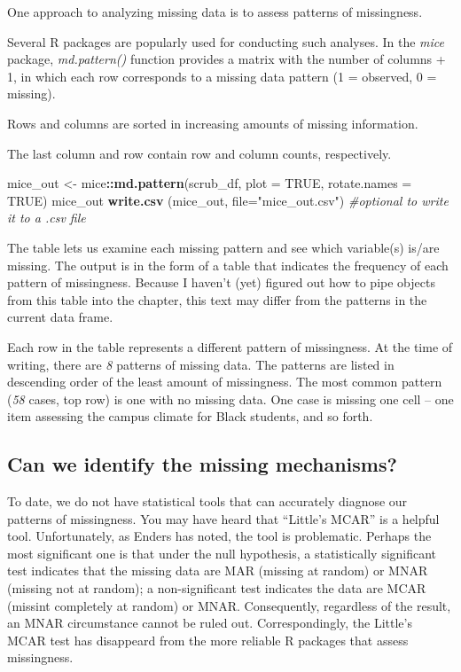 \documentclass[
  11pt,
]{book}
\newenvironment{Shaded}{\begin{snugshade}}{\end{snugshade}}
\newcommand{\AttributeTok}[1]{\textcolor[rgb]{0.27,0.27,0.27}{#1}}
\newcommand{\CommentTok}[1]{\textcolor[rgb]{0.37,0.37,0.37}{\textit{#1}}}
\newcommand{\ConstantTok}[1]{\textcolor[rgb]{0.37,0.37,0.37}{#1}}
\newcommand{\FunctionTok}[1]{\textcolor[rgb]{0.27,0.27,0.27}{\textbf{#1}}}
\newcommand{\NormalTok}[1]{#1}
\newcommand{\OtherTok}[1]{\textcolor[rgb]{0.37,0.37,0.37}{#1}}
\newcommand{\SpecialCharTok}[1]{\textcolor[rgb]{0.43,0.43,0.43}{\textbf{#1}}}
\newcommand{\StringTok}[1]{\textcolor[rgb]{0.5,0.5,0.5}{#1}}
\begin{document}
One approach to analyzing missing data is to assess patterns of missingness.

Several R packages are popularly used for conducting such analyses. In the \emph{mice} package, \emph{md.pattern()} function provides a matrix with the number of columns + 1, in which each row corresponds to a missing data pattern (1 = observed, 0 = missing).

Rows and columns are sorted in increasing amounts of missing information.

The last column and row contain row and column counts, respectively.

\begin{Shaded}
\begin{Highlighting}[]
\NormalTok{mice\_out }\OtherTok{\textless{}{-}}\NormalTok{ mice}\SpecialCharTok{::}\FunctionTok{md.pattern}\NormalTok{(scrub\_df, }\AttributeTok{plot =} \ConstantTok{TRUE}\NormalTok{, }\AttributeTok{rotate.names =} \ConstantTok{TRUE}\NormalTok{)}
\NormalTok{mice\_out}
\FunctionTok{write.csv}\NormalTok{ (mice\_out, }\AttributeTok{file=}\StringTok{"mice\_out.csv"}\NormalTok{) }\CommentTok{\#optional to write it to a .csv file}
\end{Highlighting}
\end{Shaded}

The table lets us examine each missing pattern and see which variable(s) is/are missing. The output is in the form of a table that indicates the frequency of each pattern of missingness. Because I haven't (yet) figured out how to pipe objects from this table into the chapter, this text may differ from the patterns in the current data frame.

Each row in the table represents a different pattern of missingness. At the time of writing, there are \emph{8} patterns of missing data. The patterns are listed in descending order of the least amount of missingness. The most common pattern (\emph{58} cases, top row) is one with no missing data. One case is missing one cell -- one item assessing the campus climate for Black students, and so forth.

\hypertarget{can-we-identify-the-missing-mechanisms}{%
\subsection{Can we identify the missing mechanisms?}\label{can-we-identify-the-missing-mechanisms}}

To date, we do not have statistical tools that can accurately diagnose our patterns of missingness. You may have heard that ``Little's MCAR'' is a helpful tool. Unfortunately, as Enders \citeyearpar{enders_applied_2010} has noted, the tool is problematic. Perhaps the most significant one is that under the null hypothesis, a statistically significant test indicates that the missing data are MAR (missing at random) or MNAR (missing not at random); a non-significant test indicates the data are MCAR (missint completely at random) or MNAR. Consequently, regardless of the result, an MNAR circumstance cannot be ruled out. Correspondingly, the Little's MCAR test has disappeard from the more reliable R packages that assess missingness.
\end{document}
